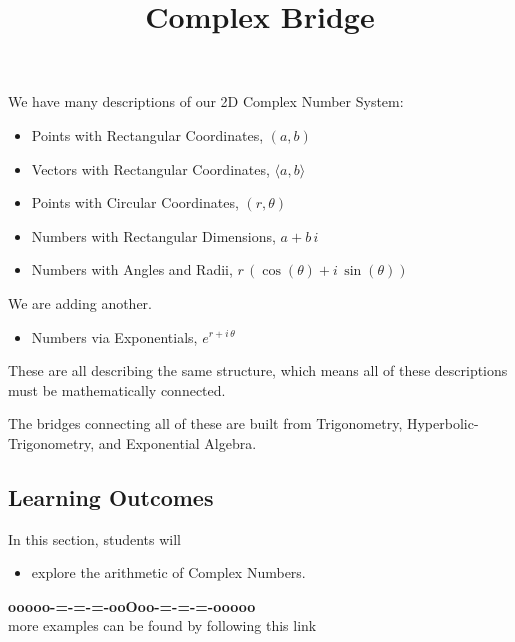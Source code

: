 \documentclass{ximera}
\title{Complex Bridge}
\begin{document}
\begin{abstract}
\end{abstract}
\maketitle




We have many descriptions of our 2D Complex Number System:

\begin{itemize}
\item Points with Rectangular Coordinates, $(a,b)$
\item Vectors with Rectangular Coordinates, $\langle a, b \rangle$
\item Points with Circular Coordinates, $(r,\theta)$
\item Numbers with Rectangular Dimensions, $a + b \, i$
\item Numbers with Angles and Radii, $r \, (\cos(\theta) + i \, \sin(\theta))$
\end{itemize}

We are adding another.

\begin{itemize}
\item Numbers via Exponentials, $e^{r + i \, \theta}$
\end{itemize}

These are all describing the same structure, which means all of these descriptions must be mathematically connected. 


The bridges connecting all of these are built from Trigonometry, Hyperbolic-Trigonometry, and Exponential Algebra.





\subsection*{Learning Outcomes}

\begin{sectionOutcomes}
In this section, students will 

\begin{itemize}
\item explore the arithmetic of Complex Numbers.
\end{itemize}
\end{sectionOutcomes}













\begin{center}
\textbf{\textcolor{green!50!black}{ooooo-=-=-=-ooOoo-=-=-=-ooooo}} \\

more examples can be found by following this link\\ 

\end{center}
\end{document}
